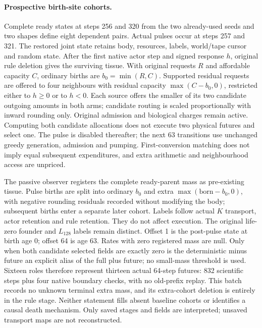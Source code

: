 \paragraph{Prospective birth-site cohorts.}
Complete ready states at steps 256 and 320 from the two already-used seeds and two shapes define eight dependent pairs. Actual pulses occur at steps 257 and 321. The restored joint state retains body, resources, labels, world/tape cursor and random state. After the first native actor step and signed response $h$, original rule deletion gives the surviving tissue. With original requests $R$ and affordable capacity $C$, ordinary births are $b_0=\min(R,C)$. Supported residual requests are offered to four neighbours with residual capacity $\max(C-b_0,0)$, restricted either to $h\geq0$ or to $h<0$. Each source offers the smaller of its two candidate outgoing amounts in both arms; candidate routing is scaled proportionally with inward rounding only. Original admission and biological charges remain active. Computing both candidate allocations does not execute two physical futures and select one. The pulse is disabled thereafter; the next 63 transitions use unchanged greedy generation, admission and pumping. First-conversion matching does not imply equal subsequent expenditures, and extra arithmetic and neighbourhood access are unpriced.

The passive observer registers the complete ready-parent mass as pre-existing tissue. Pulse births are split into ordinary $b_0$ and extra $\max(\mathrm{born}-b_0,0)$, with negative rounding residuals recorded without modifying the body; subsequent births enter a separate later cohort. Labels follow actual $K$ transport, actor retention and rule retention. They do not affect execution. The original life-zero founder and $L_{128}$ labels remain distinct. Offset 1 is the post-pulse state at birth age 0; offset 64 is age 63. Rates with zero registered mass are null. Only when both candidate selected fields are exactly zero is the deterministic minus future an explicit alias of the full plus future; no small-mass threshold is used. Sixteen roles therefore represent thirteen actual 64-step futures: 832 scientific steps plus four native boundary checks, with no old-prefix replay. This batch records no unknown terminal extra mass, and its extra-cohort deletion is entirely in the rule stage. Neither statement fills absent baseline cohorts or identifies a causal death mechanism. Only saved stages and fields are interpreted; unsaved transport maps are not reconstructed.

